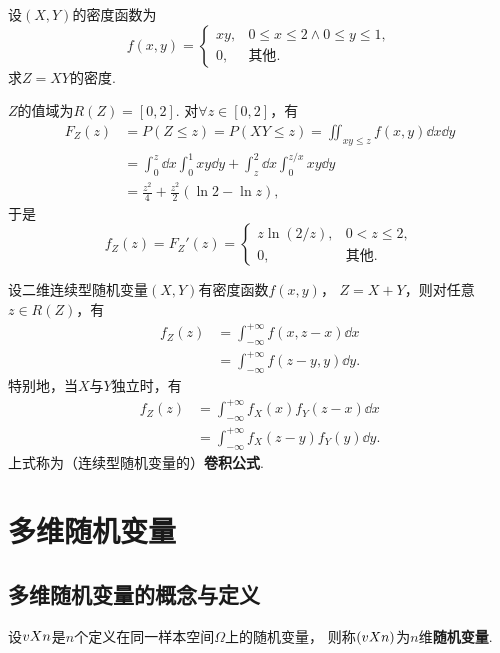 \begin{example}
设\((X,Y)\)的密度函数为\[
f(x,y) = \left\{ \begin{array}{cl}
xy, & 0 \leqslant x \leqslant 2 \land 0 \leqslant y \leqslant 1, \\
0, & \text{其他}.
\end{array} \right.
\]求\(Z = XY\)的密度.
\begin{solution}
\(Z\)的值域为\(R(Z)=[0,2]\).
对\(\forall z\in[0,2]\)，有\[\begin{aligned}
F_Z(z) &= P(Z \leqslant z)
= P(XY \leqslant z)
= \iint_{xy \leqslant z} f(x,y) \dd{x}\dd{y} \\
&= \int_0^z \dd{x} \int_0^1 xy \dd{y}
	+ \int_z^2 \dd{x} \int_0^{z/x} xy \dd{y} \\
&= \frac{z^2}{4} + \frac{z^2}{2} (\ln2 - \ln z),
\end{aligned}\]
于是\[
f_Z(z) = F_Z'(z)
= \left\{ \begin{array}{cl}
z \ln(2/z), & 0<z\leqslant2, \\
0, & \text{其他}.
\end{array} \right.
\]
\end{solution}
\end{example}

\begin{theorem}[卷积公式]\label{theorem:多维随机变量及其分布.连续型随机变量的卷积公式}
设二维连续型随机变量\((X,Y)\)有密度函数\(f(x,y)\)，%
\(Z=X+Y\)，则对任意\(z \in R(Z)\)，有\begin{align}
f_Z(z) &= \int_{-\infty}^{+\infty} f(x,z-x) \dd{x} \\
&= \int_{-\infty}^{+\infty} f(z-y,y) \dd{y}.
\end{align}
特别地，当\(X\)与\(Y\)独立时，有\begin{align}
f_Z(z) &= \int_{-\infty}^{+\infty} f_X(x) f_Y(z-x) \dd{x} \\
&= \int_{-\infty}^{+\infty} f_X(z-y) f_Y(y) \dd{y}.
\end{align}
上式称为（连续型随机变量的）\textbf{卷积公式}.
\end{theorem}

\section{多维随机变量}

\subsection{多维随机变量的概念与定义}
\begin{definition}
设\(v{X}{n}\)是\(n\)个定义在同一样本空间\(\Omega\)上的随机变量，%
则称\((v{X}{n})\)为\(n\)维\textbf{随机变量}.
\end{definition}

